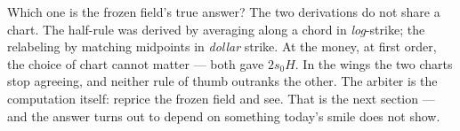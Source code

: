 Which one is the frozen field's true answer?  The two derivations do
not share a chart.  The
half-rule was derived by averaging along a chord in
\emph{log}-strike; the relabeling by matching midpoints in
\emph{dollar} strike.  At the money, at first order, the choice of
chart cannot matter --- both gave $2s_0H$.  In the wings the two
charts stop agreeing, and neither rule of thumb outranks the other.
The arbiter is the computation itself: reprice the frozen field
and see.  That is the next section --- and the answer turns out to
depend on something today's smile does not show.
